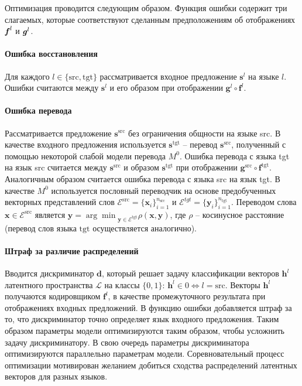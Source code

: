 \documentclass[12pt,twoside]{article}
\begin{document}
   Оптимизация проводится следующим образом. Функция ошибки содержит три слагаемых, которые соответствуют сделанным предположениям об отображениях $\textbf{\textit{f}}^{l}$ и $\textbf{\textit{g}}^{l}$.
   \paragraph{Ошибка восстановления} Для каждого $l \in \{\text{src}, \text{tgt}\}$ рассматривается входное предложение $\mathbf{s}^{l}$ на языке $l$. Ошибки считаются между $\mathbf{s}^{l}$ и его образом при отображении $\textbf{g}^{l} \circ \textbf{f}^{l}$.
   
   \paragraph{Ошибка перевода} Рассматривается предложение $\mathbf{s}^{\text{src}}$ без ограничения общности на языке src. В качестве входного предложения используется $\mathbf{s}^{\text{tgt}}$ -- перевод $\mathbf{s}^{\text{src}}$, полученный с помощью некоторой слабой модели перевода $M^0$. Ошибка перевода с языка tgt на язык src считается между $\mathbf{s}^{\text{src}}$ и образом $\mathbf{s}^{\text{tgt}}$ при отображении $\textbf{g}^{\text{src}} \circ \textbf{f}^{\text{tgt}}$. Аналогичным образом считается ошибка перевода с языка src на язык tgt. В качестве $M^0$ используется пословный переводчик на основе предобученных векторных представлений слов $\mathcal{E}^{\text{src}} = \{\textbf{x}_i\}_{i=1}^{n_{\text{src}}}$ и $\mathcal{E}^{tgt} = \{\textbf{y}_i\}_{i=1}^{n_{\text{tgt}}}$. Переводом слова $\textbf{x} \in \mathcal{E}^{\text{src}}$ является $\textbf{y} = {\arg\min}_{\textbf{y} \in  \mathcal{E}^{\text{tgt}}} \rho(\textbf{x}, \textbf{y})$, где $\rho$ -- косинусное расстояние (перевод слов языка $\text{tgt}$ осуществляется аналогично).
   
   \paragraph{Штраф за различие распределений} Вводится дискриминатор $\textbf{d}$, который решает задачу классификации векторов $\textbf{h}^l$ латентного пространства $\mathcal{L}$ на классы $\{0, 1\}$: $\textbf{h}^l \in 0 \Leftrightarrow l = \text{src}$. Векторы $\textbf{h}^l$ получаются кодировщиком $\textbf{f}^{l}$, в качестве промежуточного результата при отображениях входных предложений. В функцию ошибки добавляется штраф за то, что дискриминатор точно определяет язык входного предложения. Таким образом параметры модели оптимизируются таким образом, чтобы усложнить задачу дискриминатору. В свою очередь параметры дискриминатора оптимизируются параллельно параметрам модели. Соревновательный процесс оптимизации мотивирован желанием добиться сходства распределений латентных векторов для разных языков.
   
\end{document}
